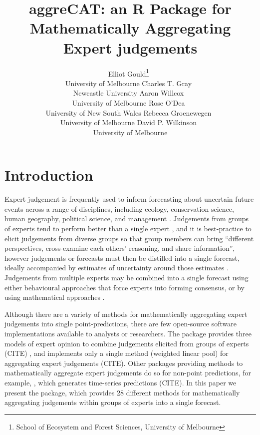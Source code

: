 \documentclass[article]{jss}
\author{Elliot
Gould\footnote{School of Ecosystem and Forest Sciences, University of
  Melbourne}~\orcidlink{0000-0002-6585-538X}\\University of
Melbourne \And Charles T.
Gray~\orcidlink{00000-0002-9978-011X}\\Newcastle University \AND Aaron
Willcox~\orcidlink{https://orcid.org/0000-0003-2536-2596}\\University of
Melbourne \And Rose O'Dea~\orcidlink{0000-0001-8177-5075}\\University of
New South Wales \AND Rebecca
Groenewegen~\orcidlink{https://orcid.org/0000-0001-9177-8536}\\University
of Melbourne \And David P.
Wilkinson~\orcidlink{0000-0002-9560-6499}\\University of Melbourne}
\title{aggreCAT: an R Package for Mathematically Aggregating Expert
judgements}
\begin{document}
\maketitle
\ifdefined\Shaded\renewenvironment{Shaded}{\begin{tcolorbox}[borderline west={3pt}{0pt}{shadecolor}, frame hidden, interior hidden, sharp corners, enhanced, breakable, boxrule=0pt]}{\end{tcolorbox}}\fi

\hypertarget{sec-introduction}{%
\section{Introduction}\label{sec-introduction}}

Expert judgement is frequently used to inform forecasting about
uncertain future events across a range of disciplines, including
ecology, conservation science, human geography, political science, and
management \citep{Sutherland2018}. Judgements from groups of experts
tend to perform better than a single expert \citep{Goossens2008}, and it
is best-practice to elicit judgements from diverse groups so that group
members can bring ``different perspectives, cross-examine each others'
reasoning, and share information'', however judgements or forecasts must
then be distilled into a single forecast, ideally accompanied by
estimates of uncertainty around those estimates \citep{Hanea2021}.
Judgements from multiple experts may be combined into a single forecast
using either behavioural approaches that force experts into forming
consensus, or by using mathematical approaches \citep{Goossens2008}.

Although there are a variety of methods for mathematically aggregating
expert judgements into single point-predictions, there are few
open-source software implementations available to analysts or
researchers. The  \citet{R} package provides
three models of expert opinion to combine judgements elicited from
groups of experts (CITE) , and  implements only a single
method (weighted linear pool) for aggregating expert judgements (CITE).
Other  packages providing methods to mathematically
aggregate expert judgements do so for non-point predictions, for
example, , which generates time-series predictions (CITE). In
this paper we present the  package, which provides 28
different methods for mathematically aggregating judgements within
groups of experts into a single forecast.
\end{document}
